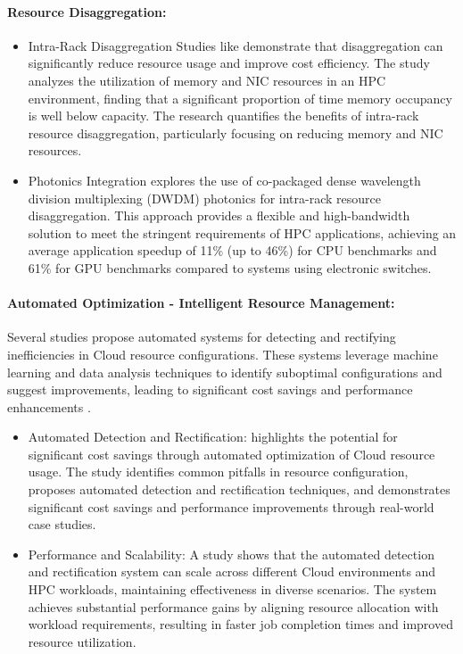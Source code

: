     \paragraph{Resource Disaggregation:}
    \begin{itemize}
        \item {Intra-Rack Disaggregation} Studies like \cite{michelogiannakis_case_2022} demonstrate that disaggregation can significantly reduce resource usage and improve cost efficiency. The study analyzes the utilization of memory and NIC resources in an HPC environment, finding that a significant proportion of time memory occupancy is well below capacity. The research quantifies the benefits of intra-rack resource disaggregation, particularly focusing on reducing memory and NIC resources.
        \item {Photonics Integration} \cite{michelogiannakis_efficient_2023} explores the use of co-packaged dense wavelength division multiplexing (DWDM) photonics for intra-rack resource disaggregation. This approach provides a flexible and high-bandwidth solution to meet the stringent requirements of HPC applications, achieving an average application speedup of 11\% (up to 46\%) for CPU benchmarks and 61\% for GPU benchmarks compared to systems using electronic switches.
    \end{itemize}

    \paragraph{Automated Optimization - Intelligent Resource Management:}

    Several studies propose automated systems for detecting and rectifying inefficiencies in Cloud resource configurations. These systems leverage machine learning and data analysis techniques to identify suboptimal configurations and suggest improvements, leading to significant cost savings and performance enhancements \cite{greneche_methodology_2022, michalewicz_attempt_2023,giannoutakis_evaluation_2021}.
    \begin{itemize}
        \item Automated Detection and Rectification: highlights the potential for significant cost savings through automated optimization of Cloud resource usage. The study identifies common pitfalls in resource configuration, proposes automated detection and rectification techniques, and demonstrates significant cost savings and performance improvements through real-world case studies.
        \item Performance and Scalability: A study shows that the automated detection and rectification system can scale across different Cloud environments and HPC workloads, maintaining effectiveness in diverse scenarios. The system achieves substantial performance gains by aligning resource allocation with workload requirements, resulting in faster job completion times and improved resource utilization.
    \end{itemize}

